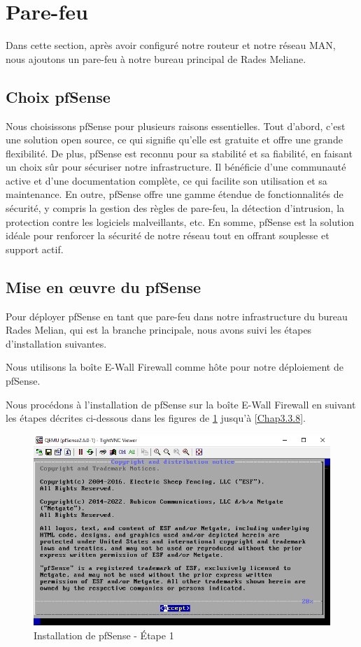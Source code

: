 \section{Pare-feu}

Dans cette section, après avoir configuré notre routeur et notre réseau MAN, nous ajoutons un pare-feu à notre bureau principal de Rades Meliane.


\subsection{Choix pfSense}

Nous choisissons pfSense pour plusieurs raisons essentielles. Tout d'abord, c'est une solution open source, ce qui signifie qu'elle est gratuite et offre une grande flexibilité. De plus, pfSense est reconnu pour sa stabilité et sa fiabilité, en faisant un choix sûr pour sécuriser notre infrastructure. Il bénéficie d'une communauté active et d'une documentation complète, ce qui facilite son utilisation et sa maintenance. En outre, pfSense offre une gamme étendue de fonctionnalités de sécurité, y compris la gestion des règles de pare-feu, la détection d'intrusion, la protection contre les logiciels malveillants, etc. En somme, pfSense est la solution idéale pour renforcer la sécurité de notre réseau tout en offrant souplesse et support actif.


\subsection{Mise en œuvre du pfSense}

Pour déployer pfSense en tant que pare-feu dans notre infrastructure du bureau Rades Melian, qui est la branche principale, nous avons suivi les étapes d'installation suivantes.


Nous utilisons la boîte E-Wall Firewall comme hôte pour notre déploiement de pfSense.


Nous procédons à l'installation de pfSense sur la boîte E-Wall Firewall en suivant les étapes décrites ci-dessous dans les figures de \ref{Chap3.3.2} jusqu'à \ref{Chap3.3.8}.

\begin{figure}[H]
\centering
\includegraphics[width=15cm]{Images/BRadesMelian-Topologie2.png}
\caption{Installation de pfSense - Étape 1}
\label{Chap3.3.2}
\end{figure}

